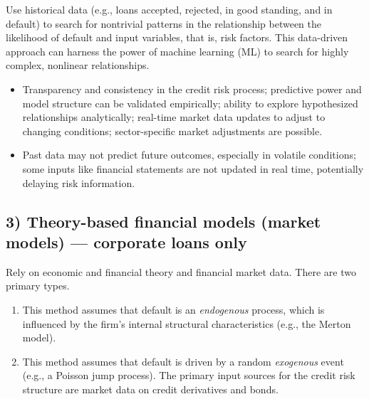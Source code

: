 Use historical data (e.g., loans accepted, rejected, in good standing, and in
default) to search for nontrivial patterns in the relationship between the
likelihood of default and input variables, that is, risk factors. This
data-driven approach can harness the power of machine learning (ML) to search for
highly complex, nonlinear relationships.

\begin{itemize}
\item {} Transparency and consistency in the credit risk process;
predictive power and model structure can be validated empirically; ability to
explore hypothesized relationships analytically; real-time market data updates to
adjust to changing conditions; sector-specific market adjustments are possible.
\item {} Past data may not predict future outcomes, especially
in volatile conditions; some inputs like financial statements are not updated in
real time, potentially delaying risk information.
\end{itemize}

\subsection*{3) Theory-based financial models (market models) --- corporate loans only}

Rely on economic and financial theory and financial market data. There are two
primary types.

\begin{enumerate}[label=\alph*)]
\item {} This method assumes that default is an
\emph{endogenous} process, which is influenced by the firm's internal structural
characteristics (e.g., the Merton model).
\item {} This method assumes that default is driven by a
random \emph{exogenous} event (e.g., a Poisson jump process). The primary input
sources for the credit risk structure are market data on credit derivatives and
bonds.
\end{enumerate}

